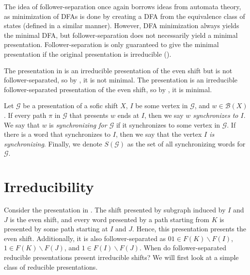 \documentclass[hidelinks]{report}
\newcommand{\Gc}{\mathcal{G}}  %
\newcommand{\Bc}{\mathcal{B}}
\newcommand{\term}[1]{\textit{#1}}
\theoremstyle{definition}
\begin{document}
The idea of follower-separation once again borrows ideas from automata theory,
 as minimization of DFAs is done by creating a DFA from the equivalence class of states 
(defined in a similar manner). However, DFA minimization always yields the minimal 
DFA, but follower-separation does not necessarily yield a minimal 
presentation. Follower-separation is only guaranteed to give the minimal presentation if the 
original presentation is irreducible (\cite[Lemma 3.3.8]{lind1995introduction}).

\begin{example}
    The presentation in  is an irreducible presentation 
    of the even shift but is not follower-separated, so by ,
    it is not minimal. The presentation  is an irreducible 
    follower-separated presentation of the even shift, so by ,
    it is minimal.
\end{example}

\begin{definition}
    Let \(\Gc\) be a presentation of a sofic shift \(X\), \(I\) be some vertex in \(\Gc\), and \(w \in \Bc(X)\).
    If every path \(\pi\) in \(\Gc\) that presents \(w\) ends at \(I\), then we say \term{\(w\) synchronizes to \(I\)}.
    We say that \(w\) is \term{synchronizing for \(\Gc\)} if it synchronizes to some vertex in \(\Gc\). 
    If there is a word that synchronizes to \(I\), then we say that the vertex \term{\(I\) is synchronizing}.
    Finally, we denote 
    \(S(\Gc)\) as the set of all synchronizing words for \(\Gc\).
\end{definition}



\chapter{Irreducibility}

Consider the presentation in .
The shift presented by subgraph induced by \(I\) and \(J\) is the even shift, and every 
word presented by a path starting from \(K\) is presented by some path starting at 
\(I\) and \(J\). Hence, this presentation presents the even shift. Additionally, it is 
also follower-separated as \(01 \in F(K)\backslash F(I)\), \(1 \in F(K)\backslash F(J)\),
and \(1 \in F(I) \backslash F(J)\). 
When do follower-separated reducible presentations present irreducible shifts? We will first look 
at a simple class of reducible presentations.
\end{document}
